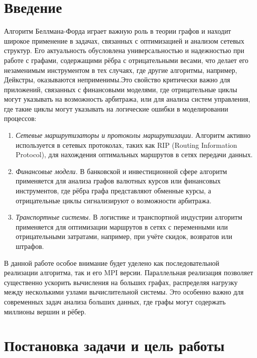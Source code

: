 \documentclass[12pt]{article}
\begin{document}
\section{Введение}

Алгоритм Беллмана-Форда играет важную роль в теории графов и находит широкое применение в задачах,
связанных с оптимизацией и анализом сетевых структур. Его актуальность обусловлена универсальностью и надежностью при работе с графами, содержащими рёбра с отрицательными весами, что делает его незаменимым инструментом в тех случаях, где другие алгоритмы, например, Дейкстры, оказываются неприменимы.Это свойство критически важно для приложений, связанных с финансовыми моделями, где отрицательные циклы могут указывать на возможность арбитража, или для анализа систем управления, где такие циклы могут указывать на логические ошибки в моделировании процессов:

\begin{enumerate}
    \item \textit{Сетевые маршрутизаторы и протоколы маршрутизации.}
       Алгоритм активно используется в сетевых протоколах, таких как RIP (Routing Information Protocol), для нахождения оптимальных маршрутов в сетях передачи данных.
    \item \textit{Финансовые модели.}
       В банковской и инвестиционной сфере алгоритм применяется для анализа графов валютных курсов или финансовых инструментов, где рёбра графа представляют обменные курсы, а отрицательные циклы сигнализируют о возможности арбитража.
    \item\textit{Транспортные системы.}
       В логистике и транспортной индустрии алгоритм применяется для оптимизации маршрутов в сетях с переменными или отрицательными затратами, например, при учёте скидок, возвратов или штрафов.
\end{enumerate}

В данной работе особое внимание будет уделено как последовательной реализации алгоритма, так и его MPI версии. Параллельная реализация позволяет существенно ускорить вычисления на больших графах, распределяя нагрузку между несколькими узлами вычислительной системы. Это особенно важно для современных задач анализа больших данных, где графы могут содержать миллионы вершин и рёбер.


\section{Постановка задачи и цель работы}
\end{document}
